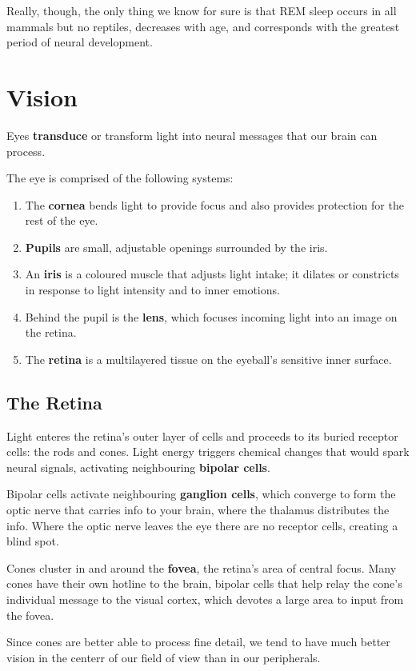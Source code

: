 \documentclass[12pt]{article}
\begin{document}
Really, though, the only thing we know for sure is that REM sleep occurs in all mammals but no reptiles, decreases with age, and corresponds with the greatest period of neural development.

\section*{Vision}
Eyes \textbf{transduce} or transform light into neural messages that our brain can process.

The eye is comprised of the following systems:
\begin{enumerate}
\item The {\bf cornea} bends light to provide focus and also provides protection for the rest of the eye.
\item {\bf Pupils} are small, adjustable openings surrounded by the iris.
\item An {\bf iris} is a coloured muscle that adjusts light intake; it dilates or constricts in response to light intensity and to inner emotions.
\item Behind the pupil is the {\bf lens}, which focuses incoming light into an image on the retina.
\item The {\bf retina} is a multilayered tissue on the eyeball's sensitive inner surface.
\end{enumerate}

\subsection*{The Retina}
Light enteres the retina's outer layer of cells and proceeds to its buried receptor cells: the rods and cones. Light energy triggers chemical changes that would spark neural signals, activating neighbouring {\bf bipolar cells}.

Bipolar cells activate neighbouring {\bf ganglion cells}, which converge to form the optic nerve that carries info to your brain, where the thalamus distributes the info.  Where the optic nerve leaves the eye there are no receptor cells, creating a blind spot.

Cones cluster in and around the \textbf{fovea}, the retina's area of central focus. Many cones have their own hotline to the brain, bipolar cells that help relay the cone's individual message to the visual cortex, which devotes a large area to input from the fovea.

Since cones are better able to process fine detail, we tend to have much better vision in the centerr of our field of view than in our peripherals.
\end{document}
